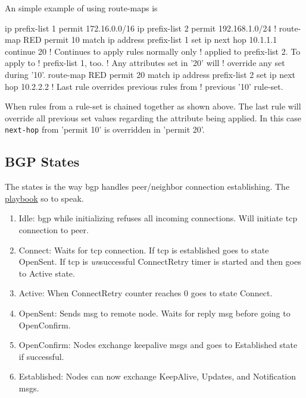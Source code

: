An simple example of using route-maps is

\begin{cisco}
ip prefix-list 1 permit 172.16.0.0/16 
ip prefix-list 2 permit 192.168.1.0/24 
!
route-map RED permit 10 
 match ip address prefix-list 1 
 set ip next hop 10.1.1.1
 continue 20              ! Continues to apply rules normally only
                          ! applied to prefix-list 2. To apply to
                          ! prefix-list 1, too.
                          ! Any attributes set in '20' will
                          ! override any set during '10'.
route-map RED permit 20 
 match ip address prefix-list 2 
 set ip next hop 10.2.2.2 ! Last rule overrides previous rules from
                          ! previous '10' rule-set.
\end{cisco}

When rules from a rule-set is chained together as shown above. The last rule will override all previous set values regarding the attribute being applied. In this case \texttt{next-hop} from 'permit 10' is overridden in 'permit 20'.

\subsection[States]{BGP States}

The states is the way \gls{bgp} handles peer/neighbor connection establishing. The \underline{playbook} so to speak.

\begin{enumerate}
    \item Idle: \gls{bgp} while initializing refuses all incoming connections. Will initiate \gls{tcp} connection to peer.
    \item Connect: Waits for \gls{tcp} connection. If \gls{tcp} is established goes to state OpenSent. If \gls{tcp} is \textit{un}successful ConnectRetry timer is started and then goes to Active state.
    \item Active: When ConnectRetry counter reaches 0 goes to state Connect.
    \item OpenSent: Sends \gls{msg} to remote node. Waits for reply \gls{msg} before going to OpenConfirm.
    \item OpenConfirm: Nodes exchange keepalive \glspl{msg} and goes to Established state if successful.
    \item Established: Nodes can now exchange KeepAlive, Updates, and Notification \glspl{msg}.
\end{enumerate}

